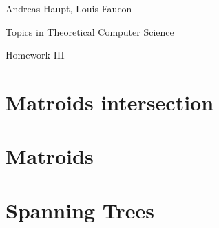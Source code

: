 \documentclass{scrartcl}
\newcommand\1{\mathbf{1}}
\begin{document}
Andreas Haupt, Louis Faucon

Topics in Theoretical Computer Science 

Homework III


\section{Matroids intersection}
\section{Matroids}
\section{Spanning Trees}
\end{document}
